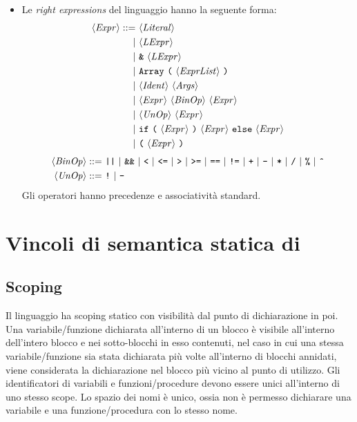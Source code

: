 \begin{itemize}
	\item Le \emph{right expressions} del linguaggio hanno la seguente forma:
	\begin{align*}
	\langle \mathit{Expr} \rangle ::=\ &\langle \mathit{Literal} \rangle\\
	|\ &\langle \mathit{LExpr} \rangle\\
	|\ &\texttt{\&}\ \langle \mathit{LExpr} \rangle\\
	|\ &\texttt{Array}\ \texttt{(}\ \langle \mathit{ExprList} \rangle\ \texttt{)}\\
	|\ &\langle \mathit{Ident} \rangle\ \langle \mathit{Args} \rangle\\
	|\ &\langle \mathit{Expr} \rangle\ \langle \mathit{BinOp} \rangle\ \langle \mathit{Expr} \rangle\\
	|\ &\langle \mathit{UnOp} \rangle\ \langle \mathit{Expr} \rangle\\
	|\ &\texttt{if}\ \texttt{(}\ \langle \mathit{Expr} \rangle\ \texttt{)}\ \langle \mathit{Expr} \rangle\ \texttt{else}\ \langle \mathit{Expr} \rangle\\
	|\ &\texttt{(}\ \langle \mathit{Expr} \rangle\ \texttt{)}
	\end{align*}
	\begin{align*}
	\token{BinOp} ::=\ 
	&\texttt{||}\ |\ \texttt{\&\&}\ |\ \texttt{<}\ |\ \texttt{<=}\ |\ \texttt{>}\ |\ \texttt{>=}\ |\ \texttt{==}\ |\  \texttt{!=}\ 
	|\ \texttt{+}\ |\ \texttt{-}\ |\ \texttt{*}\ |\ \texttt{/}\ |\ \texttt{\%}\ |\ \texttt{\^{}} \\
	\token{UnOp} ::=\ &\texttt{!}\ |\ \texttt{-}
	\end{align*}
	Gli operatori hanno precedenze e associatività standard.
\end{itemize}

\section{Vincoli di semantica statica di \SBF}
\subsection*{Scoping}
Il linguaggio ha scoping statico con visibilità dal punto di dichiarazione in poi. Una variabile/funzione dichiarata all'interno di un blocco è visibile all'interno dell'intero blocco e nei sotto-blocchi in esso contenuti, nel caso in cui una stessa variabile/funzione sia stata dichiarata più volte all'interno di blocchi annidati, viene considerata la dichiarazione nel blocco più vicino al punto di utilizzo.
Gli identificatori di variabili e funzioni/procedure devono essere unici all'interno di uno stesso scope. Lo spazio dei nomi è unico, ossia non è permesso dichiarare una variabile e una funzione/procedura con lo stesso nome. 

